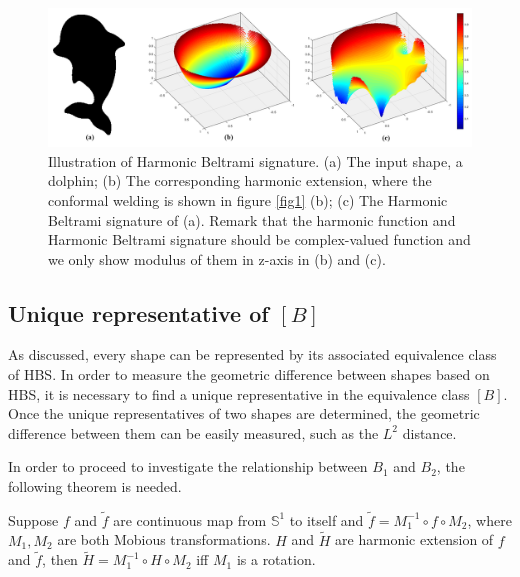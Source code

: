 \documentclass[review,onefignum,onetabnum]{siamonline190516}
\begin{document}
    \begin{figure}
        \begin{center}
            \includegraphics[width=13cm]{fig5.png}
        \end{center}
        \caption{Illustration of Harmonic Beltrami signature. (a) The input shape, a dolphin; (b) The corresponding harmonic extension, where the conformal welding is shown in figure \ref{fig1} (b); (c) The Harmonic Beltrami signature of (a). Remark that the harmonic function and Harmonic Beltrami signature should be complex-valued function and we only show modulus of them in z-axis in (b) and (c).}
        \label{illu of BS}
    \end{figure}

\subsection{Unique representative of $[B]$}
    As discussed, every shape can be represented by its associated equivalence class of HBS. In order to measure the geometric difference between shapes based on HBS, it is necessary to find a unique representative in the equivalence class $[B]$. Once the unique representatives of two shapes are determined, the geometric difference between them can be easily measured, such as the $L^2$ distance.
            
    In order to proceed to investigate the relationship between $B_1$ and $B_2$, the following theorem is needed.

    \begin{theorem}\label{rotation keep f}
        Suppose $f$ and $\tilde{f}$ are continuous map from $\mathbb{S}^1$ to itself and $\tilde{f} = M_1^{-1} \circ f \circ M_2$, where $M_1, M_2$ are both Mobious transformations. $H$ and $\tilde{H}$ are harmonic extension of $f$ and $\tilde{f}$, then $\tilde{H} = M_1^{-1} \circ H \circ M_2$ iff $M_1$ is a rotation.
    \end{theorem}
\end{document}
